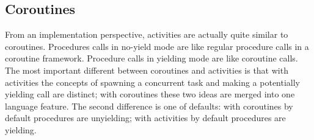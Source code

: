 \documentclass[pldi,10pt,preprint]{sigplanconf-pldi16}
\begin{document}



\subsection{Coroutines}

From an implementation perspective, activities are actually quite similar to coroutines.
Procedures calls in no-yield mode are like regular procedure calls in a coroutine framework.
Procedure calls in yielding mode are like coroutine calls.
The most important different between coroutines and activities is that with activities the concepts of spawning a concurrent task and making a potentially yielding call are distinct; with coroutines these two ideas are merged into one language feature.
The second difference is one of defaults: with coroutines by default procedures are unyielding; with activities by default procedures are yielding.
\end{document}
